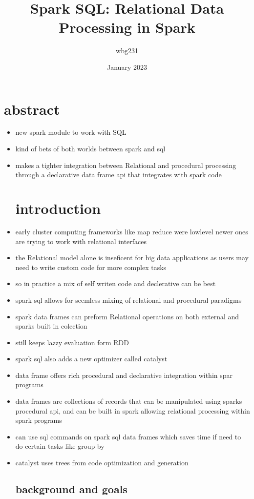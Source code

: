\documentclass{article}
\title{Spark SQL: Relational Data Processing in Spark }
\author{wbg231 }
\date{January 2023}
\begin{document}
\maketitle

\section{abstract}
\begin{itemize}
\item new spark module to work with SQL 
\item kind of bets of both worlds between spark and sql 
\item makes a tighter integration between Relational and procedural processing through a declarative data frame api that integrates with spark code
\section*{introduction}
\item early cluster computing frameworks like map reduce were lowlevel newer ones are trying to work with relational interfaces 
\item the Relational model alone is inseficent for big data applications as users may need to write custom code for more complex tasks 
\item so in practice a mix of self writen code and declerative can be best 
\item spark sql allows for seemless mixing of relational and procedural paradigms
\item spark data frames can preform Relational operations on both external and sparks built in colection
\item still keeps lazzy evaluation form RDD
\item spark sql also adds a new optimizer called catalyst 
\item data frame offers rich procedural and declarative integration within spar programs
\item data frames are collections of records that can be manipulated using sparks procedural api, and can be built in spark allowing relational processing within spark programs 
\item can use sql commands on spark sql data frames which saves time if need to do certain tasks like group by 
\item catalyst uses trees from code optimization and generation 
\subsection*{background and goals }

\end{itemize}
\end{document}
